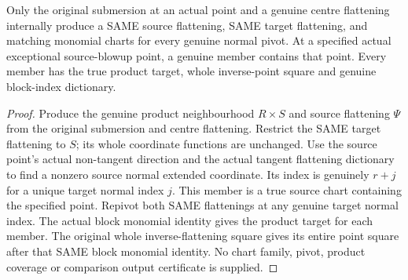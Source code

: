 \begin{lemma}
\label{hir:submersion-blowup-pivot-original-family}
\leanok
{}
Only the original submersion at an actual point and a genuine centre
flattening internally produce a SAME source flattening, SAME target
flattening, and matching monomial charts for every genuine normal pivot.
At a specified actual exceptional source-blowup point, a genuine member
contains that point. Every member has the true product target, whole
inverse-point square and genuine block-index dictionary.
\end{lemma}
\begin{proof}
Produce the genuine product neighbourhood $R\times S$ and source flattening
$\Psi$ from the original submersion and centre flattening. Restrict the
SAME target flattening to $S$; its whole coordinate functions are unchanged.
Use the source point's actual non-tangent direction and the actual tangent
flattening dictionary to find a nonzero source normal extended coordinate.
Its index is genuinely $r+j$ for a unique target normal index $j$. This
member is a true source chart containing the specified point. Repivot both
SAME flattenings at any genuine target normal index. The actual block
monomial identity gives the product target for each member. The original
whole inverse-flattening square gives its entire point square after that
SAME block monomial identity. No chart family, pivot, product coverage or
comparison output certificate is supplied.
\end{proof}

